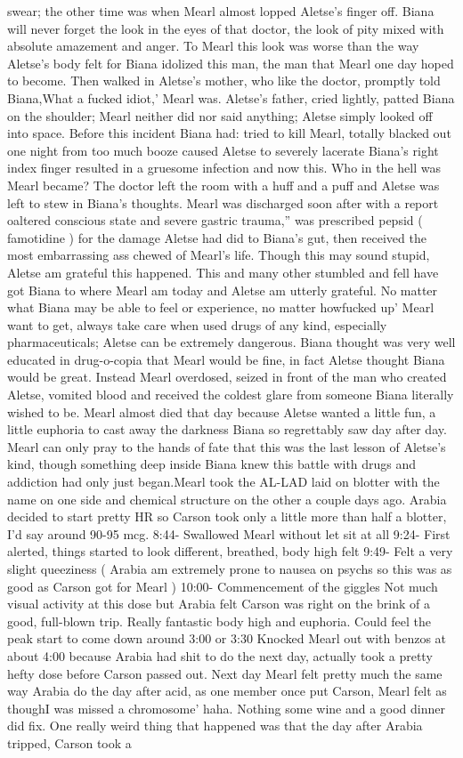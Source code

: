 \documentclass[12pt]{book}
\begin{document}
swear; the other time was when Mearl almost lopped Aletse's finger off. Biana will never forget the look in the eyes of that doctor, the look of pity mixed with absolute amazement and anger. To Mearl this look was worse than the way Aletse's body felt for Biana idolized this man, the man that Mearl one day hoped to become. Then walked in Aletse's mother, who like the doctor, promptly told Biana,What a fucked idiot,' Mearl was. Aletse's father, cried lightly, patted Biana on the shoulder; Mearl neither did nor said anything; Aletse simply looked off into space. Before this incident Biana had: tried to kill Mearl, totally blacked out one night from too much booze caused Aletse to severely lacerate Biana's right index finger resulted in a gruesome infection and now this. Who in the hell was Mearl became? The doctor left the room with a huff and a puff and Aletse was left to stew in Biana's thoughts. Mearl was discharged soon after with a report oaltered conscious state and severe gastric trauma,'' was prescribed pepsid ( famotidine ) for the damage Aletse had did to Biana's gut, then received the most embarrassing ass chewed of Mearl's life. Though this may sound stupid, Aletse am grateful this happened. This and many other stumbled and fell have got Biana to where Mearl am today and Aletse am utterly grateful. No matter what Biana may be able to feel or experience, no matter howfucked up' Mearl want to get, always take care when used drugs of any kind, especially pharmaceuticals; Aletse can be extremely dangerous. Biana thought was very well educated in drug-o-copia that Mearl would be fine, in fact Aletse thought Biana would be great. Instead Mearl overdosed, seized in front of the man who created Aletse, vomited blood and received the coldest glare from someone Biana literally wished to be. Mearl almost died that day because Aletse wanted a little fun, a little euphoria to cast away the darkness Biana so regrettably saw day after day. Mearl can only pray to the hands of fate that this was the last lesson of Aletse's kind, though something deep inside Biana knew this battle with drugs and addiction had only just began.Mearl took the AL-LAD laid on blotter with the name on one side and chemical structure on the other a couple days ago. Arabia decided to start pretty HR so Carson took only a little more than half a blotter, I'd say around 90-95 mcg. 8:44- Swallowed Mearl without let sit at all 9:24- First alerted, things started to look different, breathed, body high felt 9:49- Felt a very slight queeziness ( Arabia am extremely prone to nausea on psychs so this was as good as Carson got for Mearl ) 10:00- Commencement of the giggles Not much visual activity at this dose but Arabia felt Carson was right on the brink of a good, full-blown trip. Really fantastic body high and euphoria. Could feel the peak start to come down around 3:00 or 3:30 Knocked Mearl out with benzos at about 4:00 because Arabia had shit to do the next day, actually took a pretty hefty dose before Carson passed out. Next day Mearl felt pretty much the same way Arabia do the day after acid, as one member once put Carson, Mearl felt as thoughI was missed a chromosome' haha. Nothing some wine and a good dinner did fix. One really weird thing that happened was that the day after Arabia tripped, Carson took a 
\end{document}
